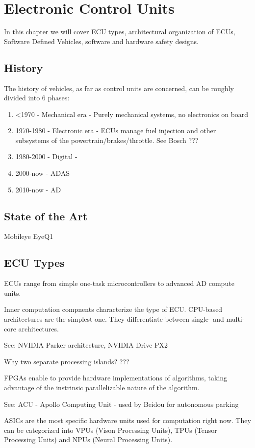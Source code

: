 \chapter{Electronic Control Units}

In this chapter we will cover ECU types, architectural organization of ECUs, Software Defined Vehicles, software and hardware safety designs.

\section{History}
The history of vehicles, as far as control units are concerned, can be roughly divided into 6 phases:
\begin{enumerate}
  \item <1970 - Mechanical era - Purely mechanical systems, no electronics on board
  \item 1970-1980 - Electronic era - ECUs manage fuel injection and other subsystems of the powertrain/brakes/throttle. See Bosch ???
  \item 1980-2000 - Digital - 
  \item 2000-now - ADAS
  \item 2010-now - AD
\end{enumerate}

\section{State of the Art}
Mobileye EyeQ1

\section{ECU Types}
ECUs range from simple one-task microcontrollers to advanced AD compute units.

Inner computation compnents characterize the type of ECU.
CPU-based architectures are the simplest one. They differentiate between single- and multi-core architectures.

See: NVIDIA Parker architecture, NVIDIA Drive PX2

Why two separate processing islands? ???

FPGAs enable to provide hardware implementations of algorithms, taking advantage of the instrinsic parallelizable nature of the algorithm.

See: ACU - Apollo Computing Unit - used by Beidou for autonomous parking

ASICs are the most specific hardware units used for computation right now. They can be categorized into VPUs (Vison Processing Units), TPUs (Tensor Processing Units) and NPUs (Neural Processing Units).

